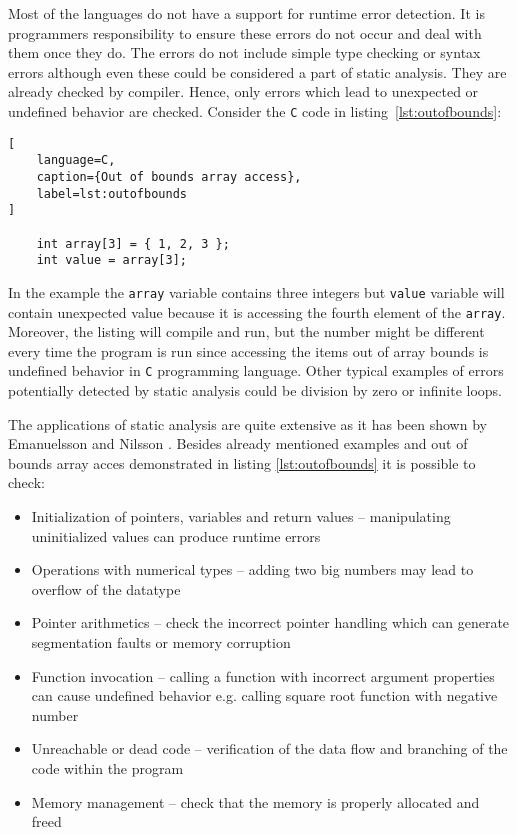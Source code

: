 \documentclass[12pt,final,oneside]{fithesis2}
\begin{document}
Most of the languages do not have a support for runtime error detection.
It is programmers responsibility to ensure these errors do not occur
and deal with them once they do. The errors do not include simple type
checking or syntax errors although even these could be considered a part
of static analysis. They are already checked by compiler. Hence, only
errors which lead to unexpected or undefined behavior are checked.
Consider the \texttt{C} code in listing~\ref{lst:outofbounds}:

\begin{lstlisting}[
    language=C,
    caption={Out of bounds array access},
    label=lst:outofbounds
]

    int array[3] = { 1, 2, 3 };
    int value = array[3];

\end{lstlisting}

In the example the \texttt{array} variable contains three integers but
\texttt{value} variable will contain unexpected value because it is
accessing the fourth element of the \texttt{array}. Moreover, the
listing will compile and run, but the number might be different every
time the program is run since accessing the items out of array bounds is
undefined behavior in \texttt{C} programming language. Other typical
examples of errors potentially detected by static analysis could be
division by zero or infinite loops.

The applications of static analysis are quite extensive as it has been
shown by Emanuelsson and Nilsson \cite{EmanuelssonNilsson08-1}. Besides
already mentioned examples and out of bounds array acces demonstrated in
listing \ref{lst:outofbounds} it is possible to check:

\begin{itemize}

\item Initialization of pointers, variables and return values --
manipulating uninitialized values can produce runtime errors

\item Operations with numerical types -- adding two big numbers may lead
to overflow of the datatype

\item Pointer arithmetics -- check the incorrect pointer handling which
can generate segmentation faults or memory corruption

\item Function invocation -- calling a function with incorrect argument
properties can cause undefined behavior e.g. calling square root
function with negative number

\item Unreachable or dead code -- verification of the data flow and
branching of the code within the program

\item Memory management -- check that the memory is properly allocated and
freed

\end{itemize}
\end{document}
